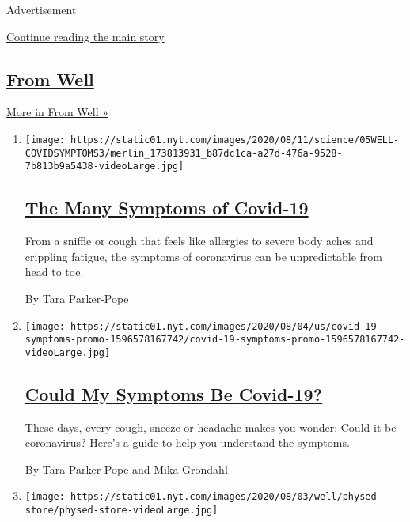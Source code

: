 Advertisement

\protect\hyperlink{after-mid1}{Continue reading the main story}

\hypertarget{from-well}{%
\subsection{\texorpdfstring{\href{/section/well}{From
Well}}{From Well}}\label{from-well}}

\href{/section/well}{More in From Well »}

\begin{enumerate}
\def\labelenumi{\arabic{enumi}.}
\item
  \texttt{[image: https://static01.nyt.com/images/2020/08/11/science/05WELL-COVIDSYMPTOMS3/merlin\_173813931\_b87dc1ca-a27d-476a-9528-7b813b9a5438-videoLarge.jpg]}

  \hypertarget{the-many-symptoms-of-covid-19}{%
  \subsection{\texorpdfstring{\href{/2020/08/05/well/live/coronavirus-covid-symptoms.html}{The
  Many Symptoms of
  Covid-19}}{The Many Symptoms of Covid-19}}\label{the-many-symptoms-of-covid-19}}

  From a sniffle or cough that feels like allergies to severe body aches
  and crippling fatigue, the symptoms of coronavirus can be
  unpredictable from head to toe.

  By Tara Parker-Pope
\item
  \texttt{[image: https://static01.nyt.com/images/2020/08/04/us/covid-19-symptoms-promo-1596578167742/covid-19-symptoms-promo-1596578167742-videoLarge.jpg]}

  \hypertarget{could-my-symptoms-be-covid-19}{%
  \subsection{\texorpdfstring{\href{/interactive/2020/08/05/well/covid-19-symptoms.html}{Could
  My Symptoms Be
  Covid-19?}}{Could My Symptoms Be Covid-19?}}\label{could-my-symptoms-be-covid-19}}

  These days, every cough, sneeze or headache makes you wonder: Could it
  be coronavirus? Here's a guide to help you understand the symptoms.

  By Tara Parker-Pope and Mika Gröndahl
\item
  \texttt{[image: https://static01.nyt.com/images/2020/08/03/well/physed-store/physed-store-videoLarge.jpg]}


\end{enumerate}
